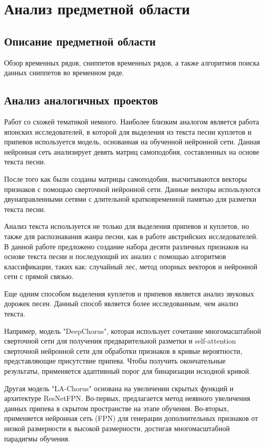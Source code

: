 \newpage
\section{Анализ предметной области}
\label{sec:Background}

\subsection{Описание предметной области}
Обзор временных рядов, сниппетов временных рядов, а также алгоритмов поиска данных сниппетов во временном ряде.
\vspace{2em}
\subsection{Анализ аналогичных проектов}
Работ со схожей тематикой немного. Наиболее близким аналогом является работа японских исследователей\cite{WatanabeG20}, в которой для выделения из текста песни куплетов и припевов используется модель, основанная на обученной нейронной сети. Данная нейронная сеть анализирует девять матриц самоподобия, составленных на основе текста песни.

После того как были созданы матрицы самоподобия, высчитываются векторы признаков с помощью сверточной нейронной сети. Данные векторы используются двунаправленными сетями с длительной кратковременной памятью для разметки текста песни.


Анализ текста используется не только для выделения припевов и куплетов, но также для распознавания жанра песни, как в работе австрийских исследователей\cite{Genre}. В данной работе предложено создание набора десяти различных признаков на основе текста песни и последующий их анализ с помощью алгоритмов классификации, таких как: случайный лес, метод опорных векторов и нейронной сети с прямой связью.


Еще одним способом выделения куплетов и припевов является анализ звуковых дорожек песен. Данный способ является более исследованным, чем анализ текста.

Например, модель "DeepChorus"\cite{DeepChorus}, которая использует сочетание многомасштабной сверточной сети для получения предварительной разметки и self-attention сверточной нейронной сети для обработки признаков в кривые вероятности, представляющие присутствие припева. Чтобы получить окончательные результаты, применяется адаптивный порог для бинаризации исходной кривой.

Другая модель "LA-Chorus"\cite{LA-Chorus} основана на увеличении скрытых функций и архитектуре ResNetFPN. Во-первых, предлагается метод неявного увеличения данных припева в скрытом пространстве на этапе обучения. Во-вторых, применяется нейронная сеть (FPN) для генерации дополнительных признаков от низкой размерности к высокой размерности, достигая многомасштабной парадигмы обучения. 

